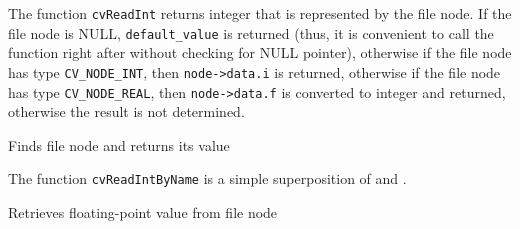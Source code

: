 \begin{description}
\end{description}


The function \texttt{cvReadInt} returns integer that is represented
by the file node. If the file node is NULL, \texttt{default\_value}
is returned (thus, it is convenient to call the function right after
 without checking for NULL pointer), otherwise if
the file node has type \texttt{CV\_NODE\_INT}, then \texttt{node->data.i} is
returned, otherwise if the file node has type \texttt{CV\_NODE\_REAL},
then \texttt{node->data.f} is converted to integer and returned, otherwise the
result is not determined.

\label{ReadIntByName}

Finds file node and returns its value


\begin{description}
\end{description}

The function \texttt{cvReadIntByName} is a simple superposition of  and .


\label{ReadReal}

Retrieves floating-point value from file node


\begin{description}
\end{description}

